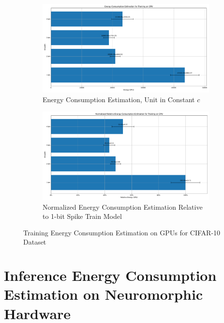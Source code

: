         \begin{figure}[H]
            \centering
            \begin{subfigure}[H]{0.48\textwidth}
                \includegraphics[width=\textwidth]{../standard/CIFAR10/plots/cifar10_train_energy_gpu.pdf}
                \caption{Energy Consumption Estimation, Unit in Constant $c$}
            \end{subfigure}
            \hfill
            \begin{subfigure}[H]{0.48\textwidth}
                \includegraphics[width=\textwidth]{../standard/CIFAR10/plots/cifar10_train_relative_energy_gpu.pdf}
                \caption{Normalized Energy Consumption Estimation Relative to 1-bit Spike Train Model}
            \end{subfigure}
            \caption{Training Energy Consumption Estimation on GPUs for CIFAR-10 Dataset}
        \end{figure}

\section{Inference Energy Consumption Estimation on Neuromorphic Hardware}
\label{appendix:energy_neuromorphic}

